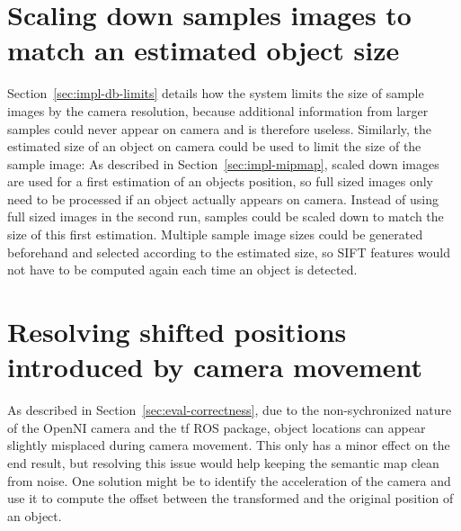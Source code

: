 \section*{Scaling down samples images to match an estimated object size}
Section~\ref{sec:impl-db-limits} details how the system limits the size of sample images by the camera resolution, because additional information from larger samples could never appear on camera and is therefore useless. Similarly, the estimated size of an object on camera could be used to limit the size of the sample image: As described in Section~\ref{sec:impl-mipmap}, scaled down images are used for a first estimation of an objects position, so full sized images only need to be processed if an object actually appears on camera. Instead of using full sized images in the second run, samples could be scaled down to match the size of this first estimation. Multiple sample image sizes could be generated beforehand and selected according to the estimated size, so SIFT features would not have to be computed again each time an object is detected.

\section*{Resolving shifted positions introduced by camera movement}
As described in Section~\ref{sec:eval-correctness}, due to the non-sychronized nature of the OpenNI camera and the tf ROS package, object locations can appear slightly misplaced during camera movement. This only has a minor effect on the end result, but resolving this issue would help keeping the semantic map clean from noise. One solution might be to identify the acceleration of the camera and use it to compute the offset between the transformed and the original position of an object.
